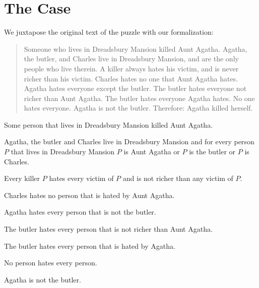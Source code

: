 \documentclass{article}
\begin{document}
\section{The Case}

We juxtapose the original text of the puzzle with our formalization:

\begin{quotation}
  \noindent Someone who lives in Dreadsbury Mansion killed Aunt Agatha.
  Agatha, the butler, and Charles live in Dreadsbury Mansion, and are the only
  people who live therein.
  A killer always hates his victim, and is never richer than his victim.
  Charles hates no one that Aunt Agatha hates.
  Agatha hates everyone except the butler.
  The butler hates everyone not richer than Aunt Agatha.
  The butler hates everyone Agatha hates.
  No one hates everyone.
  Agatha is not the butler.
  Therefore: Agatha killed herself.
\end{quotation}


\begin{forthel}
  \begin{axiom}
    Some person that lives in Dreadsbury Mansion killed Aunt Agatha.
  \end{axiom}
  \begin{axiom}
    Agatha, the butler and Charles live in Dreadsbury Mansion and for every person $P$ that lives in Dreadsbury Mansion $P$ is Aunt Agatha or $P$ is the butler or $P$ is Charles.
  \end{axiom}
  \begin{axiom}
    Every killer $P$ hates every victim of $P$ and is not richer than any victim of $P$.
  \end{axiom}
  \begin{axiom}
    Charles hates no person that is hated by Aunt Agatha.
  \end{axiom}
  \begin{axiom}
    Agatha hates every person that is not the butler.
  \end{axiom}
  \begin{axiom}
    The butler hates every person that is not richer than Aunt Agatha.
  \end{axiom}
  \begin{axiom}
    The butler hates every person that is hated by Agatha.
  \end{axiom}
  \begin{axiom}
    No person hates every person.
  \end{axiom}
  \begin{axiom}
    Agatha is not the butler.
  \end{axiom}
\end{forthel}
\end{document}
